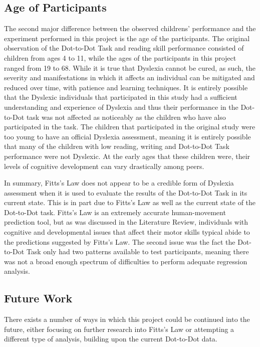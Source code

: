 	\subsection{Age of Participants}
		The second major difference between the observed childrens’ performance and the experiment performed in this project is the age of the participants. The original observation of the Dot-to-Dot Task and reading skill performance consisted of children from ages 4 to 11, while the ages of the participants in this project ranged from 19 to 68. While it is true that Dyslexia cannot be cured, as such, the severity and manifestations in which it affects an individual can be mitigated and reduced over time, with patience and learning techniques. It is entirely possible that the Dyslexic individuals that participated in this study had a sufficient understanding and experience of Dyslexia and thus their performance in the Dot-to-Dot task was not affected as noticeably as the children who have also participated in the task. The children that participated in the original study were too young to have an official Dyslexia assessment, meaning it is entirely possible that many of the children with low reading, writing and Dot-to-Dot Task performance were not Dyslexic. At the early ages that these children were, their levels of cognitive development can vary drastically among peers. 
		
		In summary, Fitts’s Law does not appear to be a credible form of Dyslexia assessment when it is used to evaluate the results of the Dot-to-Dot Task in its current state. This is in part due to Fitts’s Law as well as the current state of the Dot-to-Dot task. Fitts’s Law is an extremely accurate human-movement prediction tool, but as was discussed in the Literature Review, individuals with cognitive and developmental issues that affect their motor skills typical abide to the predictions suggested by Fitts’s Law. The second issue was the fact the Dot-to-Dot Task only had two patterns available to test participants, meaning there was not a broad enough spectrum of difficulties to perform adequate regression analysis.
		
	\subsection{Future Work}
		There exists a number of ways in which this project could be continued into the future, either focusing on further research into Fitts’s Law or attempting a different type of analysis, building upon the current Dot-to-Dot data.
		

